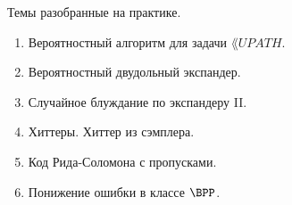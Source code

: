\breakline

Темы разобранные на практике.
\begin{enumerate}
    \item Вероятностный алгоритм для задачи $\lang{UPATH}$.
    \item Вероятностный двудольный экспандер.
    \item Случайное блуждание по экспандеру II.
    \item Хиттеры. Хиттер из сэмплера.
    \item Код Рида-Соломона с пропусками.
    \item Понижение ошибки в классе $\BPP$.
\end{enumerate}